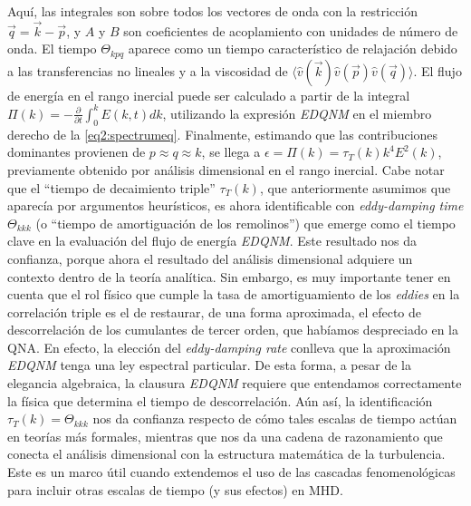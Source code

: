 Aquí, las integrales son sobre todos los vectores de onda con la
restricción $\vec{q} = \vec{k} - \vec{p}$, y $A$ y $B$ son
coeficientes de acoplamiento con unidades de número de onda.  El
tiempo $\Theta_{kpq}$ aparece como un tiempo característico de
relajación debido a las transferencias no lineales y a la viscosidad
de $\langle \hat{v}(\vec{k}) \hat{v}(\vec{p}) \hat{v}(\vec{q})
\rangle$.  El flujo de energía en el rango inercial puede ser
calculado a partir de la integral $\Pi(k) = -\frac{\partial}{\partial
  t} \int_0^k E(k, t) dk$, utilizando la expresión \textit{EDQNM} en
el miembro derecho de la \cref{eq2:spectrumeq}. Finalmente, estimando
que las contribuciones dominantes provienen de $p \approx q \approx
k$, se llega a $\epsilon = \Pi(k) = \tau_T(k) k^4 E^2(k)$, previamente
obtenido por análisis dimensional en el rango inercial. Cabe notar que
el ``tiempo de decaimiento triple'' $\tau_T(k)$, que anteriormente
asumimos que aparecía por argumentos heurísticos, es ahora
identificable con \textit{eddy-damping time} $\Theta_{kkk}$ (o
``tiempo de amortiguación de los remolinos'') que emerge como el
tiempo clave en la evaluación del flujo de energía
\textit{EDQNM}. Este resultado nos da confianza, porque ahora el
resultado del análisis dimensional adquiere un contexto dentro de la teoría
analítica. Sin embargo, es muy importante tener en cuenta que el rol
físico que cumple la tasa de amortiguamiento de los \textit{eddies} en
la correlación triple es el de restaurar, de una forma aproximada, el
efecto de descorrelación de los cumulantes de tercer orden, que
habíamos despreciado en la QNA. En efecto, la elección del
\textit{eddy-damping rate} conlleva que la aproximación \textit{EDQNM}
tenga una ley espectral particular. De esta forma, a pesar de la
elegancia algebraica, la clausura \textit{EDQNM} requiere que
entendamos correctamente la física que determina el tiempo de
descorrelación. Aún así, la identificación $\tau_T(k) = \Theta_{kkk}$
nos da confianza respecto de cómo tales escalas de tiempo actúan en
teorías más formales, mientras que nos da una cadena de razonamiento
que conecta el análisis dimensional con la estructura matemática de la
turbulencia. Este es un marco útil cuando extendemos el uso de las
cascadas fenomenológicas para incluir otras escalas de tiempo (y sus
efectos) en MHD.

